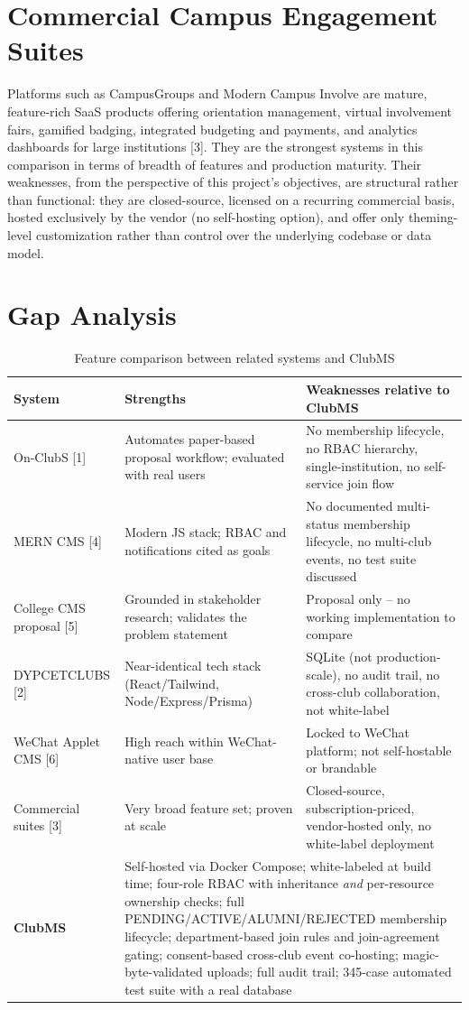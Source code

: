 \documentclass[12pt,oneside]{book}
\begin{document}
\section{Commercial Campus Engagement Suites}
Platforms such as CampusGroups and Modern Campus Involve are mature, feature-rich SaaS products offering orientation management, virtual involvement fairs, gamified badging, integrated budgeting and payments, and analytics dashboards for large institutions [3]. They are the strongest systems in this comparison in terms of breadth of features and production maturity. Their weaknesses, from the perspective of this project's objectives, are structural rather than functional: they are closed-source, licensed on a recurring commercial basis, hosted exclusively by the vendor (no self-hosting option), and offer only theming-level customization rather than control over the underlying codebase or data model.

\section{Gap Analysis}

\begin{table}[H]
\caption{Feature comparison between related systems and ClubMS}
\label{tab:2.2}
\centering
\small
\begin{tabularx}{\textwidth}{@{}p{2.6cm}X X@{}}
\toprule
System & Strengths & Weaknesses relative to ClubMS \\
\midrule
On-ClubS [1] & Automates paper-based proposal workflow; evaluated with real users & No membership lifecycle, no RBAC hierarchy, single-institution, no self-service join flow \\
MERN CMS [4] & Modern JS stack; RBAC and notifications cited as goals & No documented multi-status membership lifecycle, no multi-club events, no test suite discussed \\
College CMS proposal [5] & Grounded in stakeholder research; validates the problem statement & Proposal only -- no working implementation to compare \\
DYPCETCLUBS [2] & Near-identical tech stack (React/Tailwind, Node/Express/Prisma) & SQLite (not production-scale), no audit trail, no cross-club collaboration, not white-label \\
WeChat Applet CMS [6] & High reach within WeChat-native user base & Locked to WeChat platform; not self-hostable or brandable \\
Commercial suites [3] & Very broad feature set; proven at scale & Closed-source, subscription-priced, vendor-hosted only, no white-label deployment \\
\midrule
\textbf{ClubMS} & \multicolumn{2}{p{9.5cm}}{Self-hosted via Docker Compose; white-labeled at build time; four-role RBAC with inheritance \emph{and} per-resource ownership checks; full PENDING/ACTIVE/ALUMNI/REJECTED membership lifecycle; department-based join rules and join-agreement gating; consent-based cross-club event co-hosting; magic-byte-validated uploads; full audit trail; 345-case automated test suite with a real database} \\
\bottomrule
\end{tabularx}
\end{table}
\end{document}
